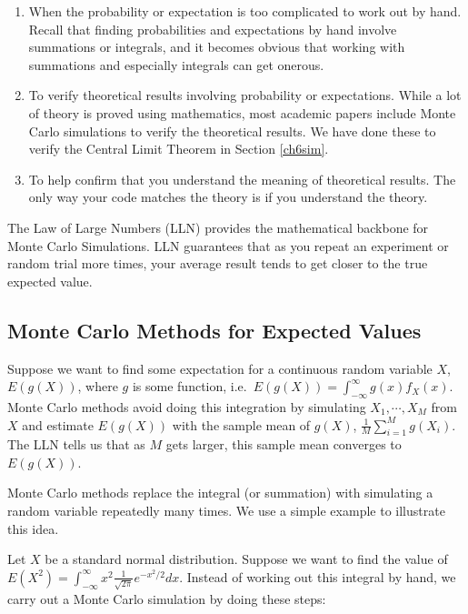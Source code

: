 \documentclass[
]{book}
\theoremstyle{definition}
\theoremstyle{definition}
\theoremstyle{definition}
\theoremstyle{definition}
\theoremstyle{remark}
\begin{document}
\begin{enumerate}
\def\labelenumi{\arabic{enumi}.}
\item
  When the probability or expectation is too complicated to work out by hand. Recall that finding probabilities and expectations by hand involve summations or integrals, and it becomes obvious that working with summations and especially integrals can get onerous.
\item
  To verify theoretical results involving probability or expectations. While a lot of theory is proved using mathematics, most academic papers include Monte Carlo simulations to verify the theoretical results. We have done these to verify the Central Limit Theorem in Section \ref{ch6sim}.
\item
  To help confirm that you understand the meaning of theoretical results. The only way your code matches the theory is if you understand the theory.
\end{enumerate}

The Law of Large Numbers (LLN) provides the mathematical backbone for Monte Carlo Simulations. LLN guarantees that as you repeat an experiment or random trial more times, your average result tends to get closer to the true expected value.

\hypertarget{monte-carlo-methods-for-expected-values}{%
\subsection{Monte Carlo Methods for Expected Values}\label{monte-carlo-methods-for-expected-values}}

Suppose we want to find some expectation for a continuous random variable \(X\), \(E(g(X))\), where \(g\) is some function, i.e.~\(E(g(X)) = \int_{-\infty}^{\infty} g(x) f_X(x).\) Monte Carlo methods avoid doing this integration by simulating \(X_1, \cdots, X_M\) from \(X\) and estimate \(E(g(X))\) with the sample mean of \(g(X)\), \(\frac{1}{M} \sum_{i=1}^M g(X_i)\). The LLN tells us that as \(M\) gets larger, this sample mean converges to \(E(g(X))\).

Monte Carlo methods replace the integral (or summation) with simulating a random variable repeatedly many times. We use a simple example to illustrate this idea.

Let \(X\) be a standard normal distribution. Suppose we want to find the value of \(E(X^2) = \int_{-\infty}^{\infty} x^2 \frac{1}{\sqrt{2 \pi}} e^{-x^2/2} dx\). Instead of working out this integral by hand, we carry out a Monte Carlo simulation by doing these steps:
\end{document}
